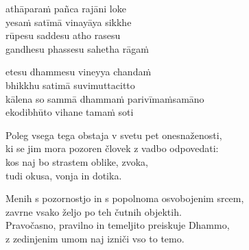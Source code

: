 athāparaṁ pañca rajāni loke\\
yesaṁ satīmā vinayāya sikkhe\\
rūpesu saddesu atho rasesu\\
gandhesu phassesu sahetha rāgaṁ

etesu dhammesu vineyya chandaṁ\\
bhikkhu satimā suvimuttacitto\\
kālena so sammā dhammaṁ parivīmaṁsamāno\\
ekodibhūto vihane tamaṁ soti


\clearpage

Poleg vsega tega obstaja v svetu pet onesnaženosti,\\
ki se jim mora pozoren človek z vadbo odpovedati:\\
kos naj bo strastem oblike, zvoka,\\
tudi okusa, vonja in dotika.

Menih s pozornostjo in s popolnoma osvobojenim srcem,\\
zavrne vsako željo po teh čutnih objektih.\\
Pravočasno, pravilno in temeljito preiskuje Dhammo,\\
z zedinjenim umom naj izniči vso to temo.

